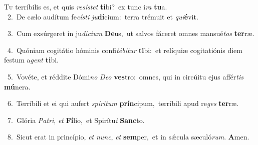 \lettrine{\initial\textcolor{\initialcolor}{T}}{u} terríbilis es, et quis \textit{re}\-\textit{sís}\textit{tet} \textbf{ti}\-bi?~\star ex tunc i\textit{ra} \textbf{tu}\-a.\\
{\numbfont\textcolor{\numbcolor}{~2.}}~De cælo audítum fe\-\textit{cís}\-\textit{ti} \textit{ju}\-\textbf{dí}cium:~\star terra trémuit et \textit{qui}\-\textbf{é}vit.\par
{\numbfont\textcolor{\numbcolor}{~3.}}~Cum exsúrgeret in ju\-\textit{dí}\-\textit{ci}\textit{um} \textbf{De}\-us,~\star ut salvos fáceret omnes mansué\textit{tos} \textbf{ter}\-ræ.\par
{\numbfont\textcolor{\numbcolor}{~4.}}~Quóniam cogitátio hóminis confi\-\textit{té}\-\textit{bi}\textit{tur} \textbf{ti}\-bi:~\star et relíquiæ cogitatiónis diem festum a\textit{gent} \textbf{ti}\-bi.\par
{\numbfont\textcolor{\numbcolor}{~5.}}~Vovéte, et réddite Dómi\textit{no} \textit{De}\-\textit{o} \textbf{ves}\-tro:~\star omnes, qui in circúitu ejus affér\textit{tis} \textbf{mú}\-nera.\par
{\numbfont\textcolor{\numbcolor}{~6.}}~Terríbili et ei qui aufert \textit{spí}\-\textit{ri}\textit{tum} \textbf{prín}\-cipum,~\star terríbili apud re\textit{ges} \textbf{ter}\-ræ.\par
{\numbfont\textcolor{\numbcolor}{~7.}}~Glória \textit{Pa}\-\textit{tri}, \textit{et} \textbf{Fí}\-lio,~\star et Spirítu\textit{i} \textbf{Sanc}\-to.\par
{\numbfont\textcolor{\numbcolor}{~8.}}~Sicut erat in princípio, \textit{et} \textit{nunc}\-, \textit{et} \textbf{sem}\-per,~\star et in sǽcula sæculó\-\textit{rum}\-. \textbf{A}\-men.\par
